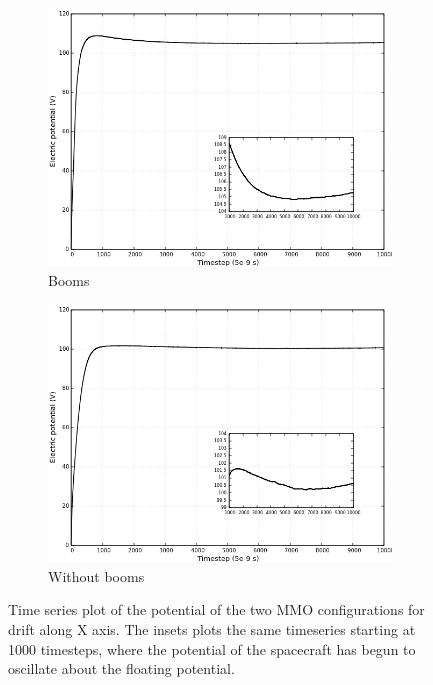 \begin{figure}[H]
  \centering
  \begin{subfigure}[b]{0.75\textwidth}
  \includegraphics[width=\columnwidth]{figures/MMO/posX/WB/C_posX_WB.png}
  \caption{Booms}
  \label{fig:C_posX_WB}
\end{subfigure}
\hfill
\begin{subfigure}[b]{0.75\textwidth}
  \includegraphics[width=\columnwidth]{figures/MMO/posX/NB/C_posX_NB.png}
  \caption{Without booms}
  \label{fig:C_posX_NB}
\end{subfigure}
\caption{Time series plot of the potential of the two MMO configurations for drift along X axis. The insets plots the same timeseries starting at 1000 timesteps, where the potential of the spacecraft has begun to oscillate about the floating potential.}
\label{fig:Conv_posX}
\end{figure}

